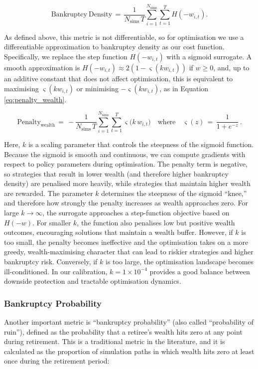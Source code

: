 \documentclass[11pt]{article}
\begin{document}
\begin{equation}\label{eq:bankruptcy_density}
\mathrm{Bankruptcy\ Density} \,=\, \frac{1}{N_{\mathrm{sims}}\,T} \sum_{i=1}^{N_{\mathrm{sims}}}\sum_{t=1}^{T} H(-w_{i,t}).
\end{equation}

As defined above, this metric is not differentiable, so for optimisation we use a differentiable approximation to bankruptcy density as our cost function. Specifically, we replace the step function \(H(-w_{i,t})\) with a sigmoid surrogate. A smooth approximation is \(H(-w_{i,t}) \approx 2(1-\varsigma(k w_{i,t}))\) if \(w \ge 0\), and, up to an additive constant that does not affect optimisation, this is equivalent to maximising \(\varsigma(k w_{i,t})\) or minimising \(-\varsigma(k w_{i,t})\), as in Equation \ref{eq:penalty_wealth}.

\begin{equation}\label{eq:penalty_wealth}
\mathrm{Penalty}_{\mathrm{wealth}} \,=\, -\frac{1}{N_{\mathrm{sims}}\,T} \sum_{i=1}^{N_{\mathrm{sims}}}\sum_{t=1}^{T} \varsigma\bigl(k\,w_{i,t}\bigr) \quad\text{where}\quad \varsigma(z)\,=\,\frac{1}{1+e^{-z}}\,.
\end{equation}

Here, \(k\) is a scaling parameter that controls the steepness of the sigmoid function. Because the sigmoid is smooth and continuous, we can compute gradients with respect to policy parameters during optimisation. The penalty term is negative, so strategies that result in lower wealth (and therefore higher bankruptcy density) are penalised more heavily, while strategies that maintain higher wealth are rewarded. The parameter $k$ determines the steepness of the sigmoid ``knee,'' and therefore how strongly the penalty increases as wealth approaches zero. For large $k \to \infty$, the surrogate approaches a step-function objective based on \(H(-w)\). For smaller $k$, the function also penalises low but positive wealth outcomes, encouraging solutions that maintain a wealth buffer. However, if $k$ is too small, the penalty becomes ineffective and the optimisation takes on a more greedy, wealth-maximising character that can lead to riskier strategies and higher bankruptcy risk. Conversely, if $k$ is too large, the optimisation landscape becomes ill-conditioned. In our calibration, $k = 1 \times 10^{-4}$ provides a good balance between downside protection and tractable optimisation dynamics.

\subsubsection{Bankruptcy Probability}
Another important metric is ``bankruptcy probability'' (also called ``probability of ruin''), defined as the probability that a retiree's wealth hits zero at any point during retirement. This is a traditional metric in the literature, and it is calculated as the proportion of simulation paths in which wealth hits zero at least once during the retirement period:
\end{document}
